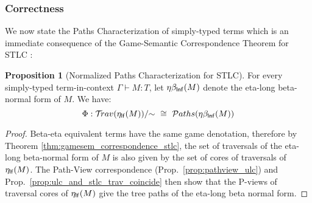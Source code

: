\documentclass{article}
\theoremstyle{definition}
\newtheorem{proposition}{Proposition}[section]
\newcommand{\travulc}{\travset}
\newcommand\pathset{{\mathcal{P}aths}} %
\begin{document}
\subsubsection*{Correctness}




We now state the Paths Characterization of simply-typed terms which is an immediate consequence of the Game-Semantic Correspondence Theorem for STLC \cite{BlumPhd}:
\begin{proposition}[Normalized Paths Characterization for STLC]
\label{prop:path_charact_stlc}
For every simply-typed term-in-context $\Gamma\vdash M :T$, let $\eta\beta_{\sf lnf}(M)$ denote the eta-long beta-normal form of $M$. We have:
\begin{equation*}
\Phi : \travulc(\etalf{M})/{\sim}\ \cong\ \pathset(\etabetalnf{M})
\end{equation*}
\end{proposition}
\begin{proof}
 Beta-eta equivalent terms have the same game denotation, therefore by Theorem \ref{thm:gamesem_correspondence_stlc}, the set of traversals of the eta-long beta-normal form of $M$ is also given by the set of cores of traversals of $\eta_{\sf lf}(M)$. The Path-View correspondence (Prop.~\ref{prop:pathview_ulc}) and Prop.~\ref{prop:ulc_and_stlc_trav_coincide} then show that the P-views of traversal cores of $\eta_{\sf lf}(M)$ give the tree paths of the eta-long beta normal form.
\end{proof}
\end{document}
